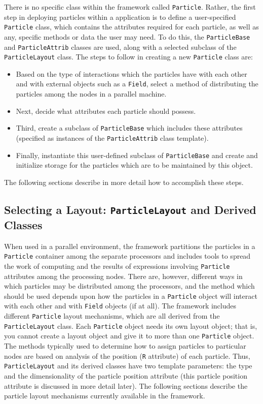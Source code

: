 There is no specific class within the \ippl framework called \texttt{Particle}. Rather, the first step in deploying particles within a \ippl application is to define a user-specified \texttt{Particle} class, which contains the attributes required for each particle, as well as any, specific methods or data the user may need. To do this, the \texttt{ParticleBase} and \texttt{ParticleAttrib} classes are used, along with a selected subclass of the \texttt{ParticleLayout} class. The steps to follow in creating a new \texttt{Particle} class are:
\begin{itemize}
    \item Based on the type of interactions which the particles have with each other and with external objects such as a \texttt{Field}, select a method of distributing the particles among the nodes in a parallel machine.
    \item Next, decide what attributes each particle should possess.
    \item Third, create a subclass of \texttt{ParticleBase} which includes these attributes (specified as instances of the \texttt{ParticleAttrib} class template).
    \item Finally, instantiate this user-defined subclass of \texttt{ParticleBase} and create and initialize storage for the particles which are to be maintained by this object.
\end{itemize}

The following sections describe in more detail how to accomplish these steps.

\subsection{Selecting a Layout: \texttt{ParticleLayout} and Derived Classes}

When used in a parallel environment, the \ippl framework partitions the particles in a \texttt{Particle} container among the separate processors and includes tools to spread the work of computing and the results of expressions involving \texttt{Particle} attributes among the processing nodes. There are, however, different ways in which particles may be distributed among the processors, and the method which should be used depends upon how the particles in a \texttt{Particle}
object will interact with each other and with \texttt{Field} objects (if at all). The \ippl framework includes different \texttt{Particle} layout mechanisms, which are all derived from the \texttt{ParticleLayout} class. Each \texttt{Particle} object needs its own layout object; that is, you cannot create a layout object and give it to more than one \texttt{Particle} object. The methods typically used to determine how to assign particles to particular nodes are based on analysis of the
position (\texttt{R} attribute) of each particle. Thus, \texttt{ParticleLayout} and its derived classes have two template parameters: the type and the dimensionality of the particle position attribute (this particle position attribute is discussed in more detail later). The following sections describe the particle layout mechanisms currently available in the \ippl framework.

